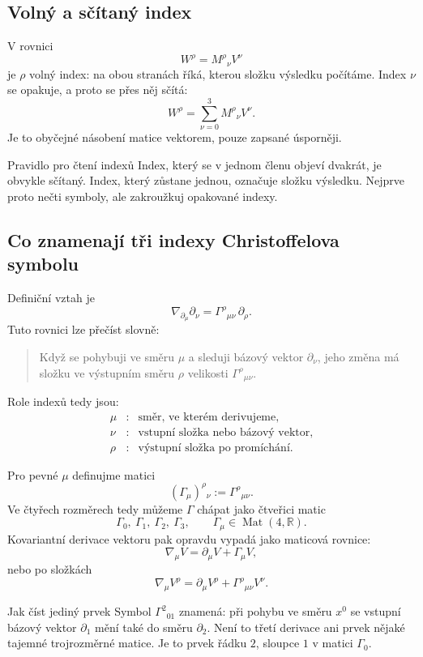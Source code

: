 \subsection{Volný a sčítaný index}
V rovnici
\[
  W^\rho=M^\rho{}_{\nu}V^\nu
\]
je $\rho$ volný index: na obou stranách říká, kterou složku výsledku počítáme.
Index $\nu$ se opakuje, a proto se přes něj sčítá:
\[
  W^\rho=\sum_{\nu=0}^{3}M^\rho{}_{\nu}V^\nu.
\]
Je to obyčejné násobení matice vektorem, pouze zapsané úsporněji.

\begin{memorybox}{Pravidlo pro čtení indexů}
Index, který se v jednom členu objeví dvakrát, je obvykle sčítaný. Index, který
zůstane jednou, označuje složku výsledku. Nejprve proto nečti symboly, ale
zakroužkuj opakované indexy.
\end{memorybox}

\subsection{Co znamenají tři indexy Christoffelova symbolu}
Definiční vztah je
\[
  \nabla_{\partial_\mu}\partial_\nu
  =\Gamma^\rho{}_{\mu\nu}\,\partial_\rho.
\]
Tuto rovnici lze přečíst slovně:
\begin{quote}
Když se pohybuji ve směru $\mu$ a sleduji bázový vektor $\partial_\nu$, jeho
změna má složku ve výstupním směru $\rho$ velikosti
$\Gamma^\rho{}_{\mu\nu}$.
\end{quote}
Role indexů tedy jsou:
\[
\boxed{
\begin{array}{ccl}
\mu &:& \text{směr, ve kterém derivujeme},\\
\nu &:& \text{vstupní složka nebo bázový vektor},\\
\rho&:& \text{výstupní složka po promíchání}.
\end{array}}
\]

Pro pevné $\mu$ definujme matici
\[
  (\Gamma_\mu)^\rho{}_{\nu}:=\Gamma^\rho{}_{\mu\nu}.
\]
Ve čtyřech rozměrech tedy můžeme $\Gamma$ chápat jako čtveřici matic
\[
  \Gamma_0,\ \Gamma_1,\ \Gamma_2,\ \Gamma_3,
  \qquad \Gamma_\mu\in\operatorname{Mat}(4,\mathbb R).
\]
Kovariantní derivace vektoru pak opravdu vypadá jako maticová rovnice:
\[
  \nabla_\mu V=\partial_\mu V+\Gamma_\mu V,
\]
nebo po složkách
\[
  \nabla_\mu V^\rho
  =\partial_\mu V^\rho+\Gamma^\rho{}_{\mu\nu}V^\nu.
\]

\begin{examplebox}{Jak číst jediný prvek}
Symbol $\Gamma^2{}_{01}$ znamená: při pohybu ve směru $x^0$ se vstupní bázový
vektor $\partial_1$ mění také do směru $\partial_2$. Není to třetí derivace ani
prvek nějaké tajemné trojrozměrné matice. Je to prvek řádku $2$, sloupce $1$ v
matici $\Gamma_0$.
\end{examplebox}

